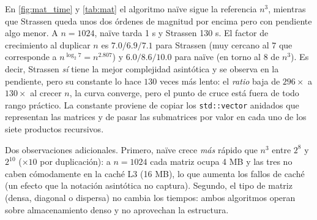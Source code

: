 En \cref{fig:mat_time} y \cref{tab:mat} el algoritmo naïve sigue la referencia $n^3$, mientras que Strassen queda unos dos órdenes de magnitud por encima pero con pendiente algo menor. A $n=1024$, naïve tarda 1 s y Strassen 130 s. El factor de crecimiento al duplicar $n$ es $7.0 / 6.9 / 7.1$ para Strassen (muy cercano al $7$ que corresponde a $n^{\log_2 7} = n^{2.807}$) y $6.0 / 8.6 / 10.0$ para naïve (en torno al $8$ de $n^3$). Es decir, Strassen \emph{sí} tiene la mejor complejidad asintótica y se observa en la pendiente, pero su constante lo hace $130$ veces más lento: el \emph{ratio} baja de $296\times$ a $130\times$ al crecer $n$, la curva converge, pero el punto de cruce está fuera de todo rango práctico. La constante proviene de copiar los \texttt{std::vector} anidados que representan las matrices y de pasar las submatrices por valor en cada uno de los siete productos recursivos.

Dos observaciones adicionales. Primero, naïve crece \emph{más} rápido que $n^3$ entre $2^8$ y $2^{10}$ ($\times 10$ por duplicación): a $n=1024$ cada matriz ocupa 4 MB y las tres no caben cómodamente en la caché L3 (16 MB), lo que aumenta los fallos de caché (un efecto que la notación asintótica no captura). Segundo, el tipo de matriz (densa, diagonal o dispersa) no cambia los tiempos: ambos algoritmos operan sobre almacenamiento denso y no aprovechan la estructura.
